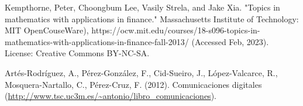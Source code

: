 \documentclass[graybox,sectrefs]{svmono_mod}
\begin{document}
\begin{thebibliography}{99.}

Kempthorne, Peter, Choongbum Lee, Vasily Strela, and Jake Xia. "Topics in mathematics with applications in finance." Massachusetts Institute of Technology: MIT OpenCouseWare), https://ocw.mit.edu/courses/18-s096-topics-in-mathematics-with-applications-in-finance-fall-2013/ (Accessed Feb, 2023). License: Creative Commons BY-NC-SA.

Artés-Rodríguez, A., Pérez-González, F., Cid-Sueiro, J., López-Valcarce, R., Mosquera-Nartallo, C., Pérez-Cruz, F. (2012). Comunicaciones digitales (\url{http://www.tsc.uc3m.es/~antonio/libro_comunicaciones}).



\end{thebibliography}
\end{document}
